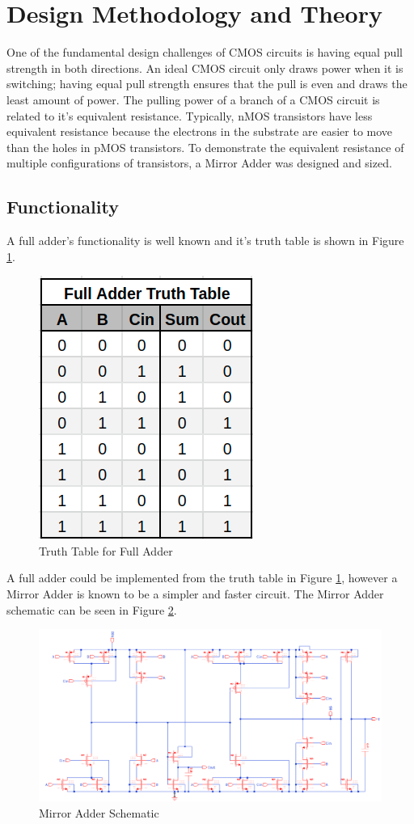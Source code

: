 \documentclass[11pt]{article}
\begin{document}
\section{Design Methodology and Theory}
	
	One of the fundamental design challenges of CMOS circuits is having equal pull strength in both directions. An ideal CMOS circuit only draws power when it is switching; having equal pull strength ensures that the pull is even and draws the least amount of power. The pulling power of a branch of a CMOS circuit is related to it's equivalent resistance. Typically, nMOS transistors have less equivalent resistance because the electrons in the substrate are easier to move than the holes in pMOS transistors. To demonstrate the equivalent resistance of multiple configurations of transistors, a Mirror Adder was designed and sized. 
	
	\subsection{Functionality}
		A full adder's functionality is well known and it's truth table is shown in Figure \ref{fig:truth-table}.
		
		\begin{figure}[H]
			\centering
			\includegraphics[width=0.4\linewidth]{"Pictures/Truth Table"}
			\caption{Truth Table for Full Adder}
			\label{fig:truth-table}
		\end{figure}
	
		A full adder could be implemented from the truth table in Figure \ref{fig:truth-table}, however a Mirror Adder is known to be a simpler and faster circuit. The Mirror Adder schematic can be seen in Figure \ref{fig:mirror-adder-schematic}.
	
		\begin{figure}[H]
			\centering
			\includegraphics[width=0.9\linewidth]{"Pictures/Mirror Adder Schematic"}
			\caption{Mirror Adder Schematic}
			\label{fig:mirror-adder-schematic}
		\end{figure}
	
\end{document}
